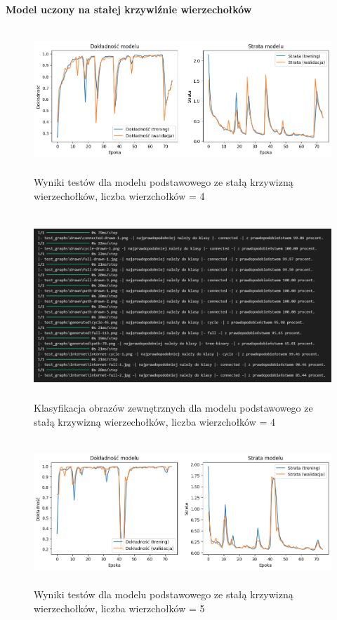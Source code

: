 \textbf{Model uczony na stałej krzywiźnie wierzechołków}

\begin{figure}[ht]
	\centering
	\includegraphics[height=5.5cm]{resources/tests/images/v2/base4_img.png}
	\caption{Wyniki testów dla modelu podstawowego ze stałą krzywizną wierzechołków, liczba wierzchołków = 4}
	\label{Fig:tests-base-1}
\end{figure}
\FloatBarrier

\begin{figure}[ht]
	\centering
	\includegraphics[height=7cm]{resources/tests/images/v2/base4_txt.png}
	\caption{Klasyfikacja obrazów zewnętrznych dla modelu podstawowego ze stałą krzywizną wierzechołków, liczba wierzchołków = 4}
	\label{Fig:tests-base-2}
\end{figure}
\FloatBarrier

\begin{figure}[ht]
	\centering
	\includegraphics[height=5.5cm]{resources/tests/images/v2/base5_img.png}
	\caption{Wyniki testów dla modelu podstawowego ze stałą krzywizną wierzechołków, liczba wierzchołków = 5}
	\label{Fig:tests-base-1}
\end{figure}
\FloatBarrier

